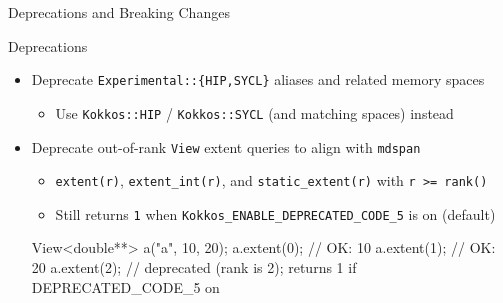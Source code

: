 

\begin{frame}[fragile]

  {\Huge Deprecations and Breaking Changes}

  \vspace{10pt}

\end{frame}


\begin{frame}[fragile]{Deprecations}
  \begin{itemize}
    \item Deprecate \texttt{Experimental::\{HIP,SYCL\}} aliases and related memory spaces %
      \begin{itemize}
        \item Use \texttt{Kokkos::HIP} / \texttt{Kokkos::SYCL} (and matching spaces) instead
      \end{itemize}
    \item Deprecate out-of-rank \texttt{View} extent queries to align with \texttt{mdspan} %
      \begin{itemize}
        \item \texttt{extent(r)}, \texttt{extent\_int(r)}, and \texttt{static\_extent(r)} with \texttt{r >= rank()} %
        \item Still returns \texttt{1} when \texttt{Kokkos\_ENABLE\_DEPRECATED\_CODE\_5} is on (default)
      \end{itemize}
    \begin{code}[language=C++]
View<double**> a("a", 10, 20);
a.extent(0);  // OK: 10
a.extent(1);  // OK: 20
a.extent(2);  // deprecated (rank is 2); returns 1 if DEPRECATED_CODE_5 on
    \end{code}
  \end{itemize}
\end{frame}

